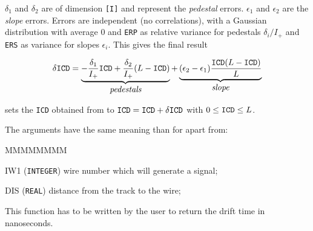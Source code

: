  
$\delta_1$ and $\delta_2 $ are of dimension {\tt [I]} and represent the 
{\it pedestal} errors. $\epsilon_1$ and $\epsilon_2$ are the {\it slope} errors.
Errors are independent (no correlations), with a Gaussian distribution with 
average 0 and {\tt ERP} as relative variance for pedestals $\delta_i/I_+$ 
and {\tt ERS} as variance for slopes $\epsilon_i$.  This gives the final result
 
\[
\delta \mbox{\tt ICD}   = \underbrace{-\frac{\delta_1}{I_+}\mbox{\tt ICD} +
                 \frac{\delta_2}{I_+}(L-\mbox{\tt ICD})}_{\mbox{\it pedestals}}
               +
 \underbrace{(\epsilon_2-\epsilon_1)
\frac{\mbox{\tt ICD}(L-\mbox{\tt ICD})}{L}}_{\mbox{\it slope}}
\]

 sets the {\tt ICD} obtained from  to
$\mbox{\tt ICD}=\mbox{\tt ICD}+\delta \mbox{\tt ICD}$ with 
$ 0 \leq \mbox{\tt ICD}\leq L$.

The arguments have the same meaning than for  apart from:
\begin{DLtt}{MMMMMMMM}
\item[IW1] ({\tt INTEGER}) wire number which will generate a signal;
\item[DIS] ({\tt REAL}) distance from the track to the wire;
\end{DLtt}
This function has to be written by the user to return the drift time
in nanoseconds.
